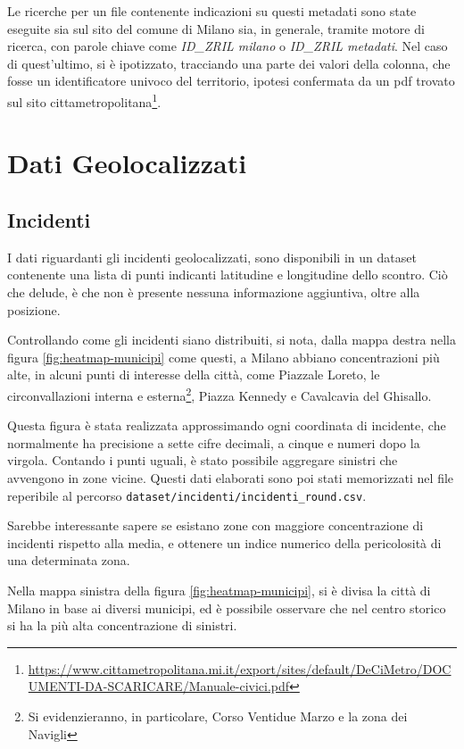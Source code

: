 \documentclass[a4paper,12pt]{report}
\newcommand{\filenamestyle}[1]{\texttt{#1}}
\newcommand{\quotestyle}[1]{\textit{#1}}
\begin{document}
Le ricerche per un file contenente indicazioni su questi metadati sono state eseguite sia 
sul sito del comune di Milano sia, in generale, tramite motore di ricerca, con parole chiave 
come \quotestyle{ID\_ZRIL milano} o \quotestyle{ID\_ZRIL metadati}. 
Nel caso di quest'ultimo, si è ipotizzato, tracciando una parte dei valori della colonna, 
che fosse un identificatore univoco del territorio, ipotesi confermata 
da un pdf trovato sul sito 
cittametropolitana\footnote{\url{https://www.cittametropolitana.mi.it/export/sites/default/DeCiMetro/DOCUMENTI-DA-SCARICARE/Manuale-civici.pdf}}. 

\chapter{Dati Geolocalizzati}

\section{Incidenti}

I dati riguardanti gli incidenti geolocalizzati, sono disponibili in un dataset 
contenente una lista di punti indicanti latitudine e longitudine dello scontro. 
Ciò che delude, è che non è presente nessuna informazione aggiuntiva, 
oltre alla posizione. 

Controllando come gli incidenti siano distribuiti, 
si nota, dalla mappa destra nella figura \ref{fig:heatmap-municipi} come questi, 
a Milano abbiano concentrazioni più alte, 
in alcuni punti di interesse della città, come Piazzale Loreto, le circonvallazioni 
interna e esterna\footnote{Si evidenzieranno, in particolare, Corso Ventidue Marzo 
e la zona dei Navigli}, Piazza Kennedy e Cavalcavia del Ghisallo. 

Questa figura è stata realizzata approssimando ogni coordinata di incidente, che  
normalmente ha precisione a sette cifre decimali, a cinque e numeri dopo la virgola. 
Contando i punti uguali, è stato possibile aggregare sinistri che avvengono in zone 
vicine. 
Questi dati elaborati sono poi stati memorizzati nel file reperibile al 
percorso \filenamestyle{dataset/incidenti/incidenti\_round.csv}. 

Sarebbe interessante sapere se esistano zone con maggiore concentrazione 
di incidenti rispetto alla media, e ottenere un indice numerico 
della pericolosità di una determinata zona. 

Nella mappa sinistra della figura \ref{fig:heatmap-municipi}, si è divisa 
la città di Milano in base ai diversi municipi, ed è possibile 
osservare che nel centro storico si ha la più alta concentrazione di sinistri. 
\end{document}
